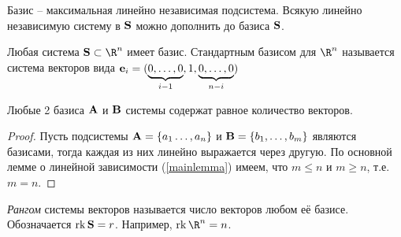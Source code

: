 \begin{stm}
  Базис -- максимальная линейно независимая подсистема. Всякую линейно
  независимую систему в $\mathbf{S}$ можно дополнить до базиса $\mathbf{S}$.
\end{stm}

\begin{stm}
  Любая система $\Sb\subset\R^n$ имеет базис. Стандартным базисом для $\R^n$ называется система векторов вида $\mathbf{e}_i = (\underbrace{0,\dots,0}_{i-1},1,\underbrace{0,\dots,0}_{n-i})$
\end{stm}

\begin{theorem}
  Любые 2 базиса $\mathbf{A}$ и $\mathbf{B}$ системы содержат равное количество векторов.
\end{theorem}
\begin{proof}
  Пусть подсистемы $\mathbf{A} = \{a_1\dots,a_n\}$ и $\mathbf{B}=\{b_1,\dots,b_m\}$
  являются базисами, тогда каждая из них линейно выражается через
  другую. По основной лемме о линейной зависимости (\ref{mainlemma})
  имеем, что $m\le n $ и $m\ge n$, т.е. $m=n$.
\end{proof}

\begin{df}
  \emph{Рангом} системы векторов называется число векторов любом её базисе. Обозначается $\operatorname{rk}\mathbf{S} = r$. Например, $\rk\R^n=n$.
\end{df}


